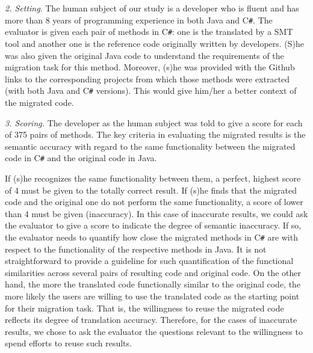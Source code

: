 
\emph{2. Setting}. The human subject of our study is a developer who
is fluent and has more than 8 years of programming experience in both
Java and C\texttt{\#}. The evaluator is given each pair of methods in
C\texttt{\#}: one is the translated by a SMT tool and another one is
the reference code originally written by developers.
%
(S)he was also given the original Java code to understand the
requirements of the migration task for this method. Moreover, (s)he
was provided with the Github links to the corresponding projects from
which those methods were extracted (with both Java and C\texttt{\#}
versions). This would give him/her a better context of the migrated
code.

\emph{3. Scoring.} The developer as the human subject was
told to give a score for each of 375 pairs of methods. The key
criteria in evaluating the migrated results is the semantic accuracy
with regard to the same functionality between the migrated code in
C\texttt{\#} and the original code in Java. 

If (s)he recognizes the same functionality between them, a perfect,
highest score of 4 must be given to the totally correct result. If
(s)he finds that the migrated code and the original one do not perform
the same functionality, a score of lower than 4 must be given
(inaccuracy). In this case of inaccurate results, we could ask the
evaluator to give a score to indicate the degree of semantic
inaccuracy. If so, the evaluator needs to quantify how close the
migrated methods in C\texttt{\#} are with respect to the functionality
of the respective methods in Java.  It is not straightforward to
provide a guideline for such quantification of the functional
similarities across several pairs of resulting code and original code.
%
On the other hand, the more the translated code functionally similar
to the original code, the more likely the users are willing to use the
translated code as the starting point for their migration task. That
is, the willingness to reuse the migrated code reflects its degree of
translation accuracy.
%
%
Therefore, for the cases of inaccurate results, we chose to ask the
evaluator the questions relevant to the willingness to spend efforts
to reuse such results.

